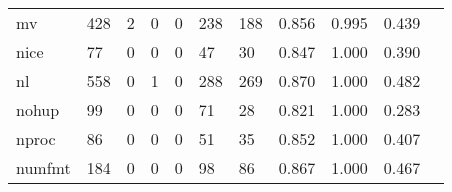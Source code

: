 \begin{longtable}{lp{1.2cm}p{1.2cm}p{1.2cm}p{1.2cm}p{1.2cm}p{1.2cm}p{1.2cm}p{1.2cm}p{1.2cm}p{1.2cm}}
mv        &                                   428 &                                                  2 &                                                  0 &                                                  0 &                                                238 &                                                188 &                                              0.856 &                                              0.995 &                                              0.439 \\
nice      &                                    77 &                                                  0 &                                                  0 &                                                  0 &                                                 47 &                                                 30 &                                              0.847 &                                              1.000 &                                              0.390 \\
nl        &                                   558 &                                                  0 &                                                  1 &                                                  0 &                                                288 &                                                269 &                                              0.870 &                                              1.000 &                                              0.482 \\
nohup     &                                    99 &                                                  0 &                                                  0 &                                                  0 &                                                 71 &                                                 28 &                                              0.821 &                                              1.000 &                                              0.283 \\
nproc     &                                    86 &                                                  0 &                                                  0 &                                                  0 &                                                 51 &                                                 35 &                                              0.852 &                                              1.000 &                                              0.407 \\
numfmt    &                                   184 &                                                  0 &                                                  0 &                                                  0 &                                                 98 &                                                 86 &                                              0.867 &                                              1.000 &                                              0.467 \\

\end{longtable}
